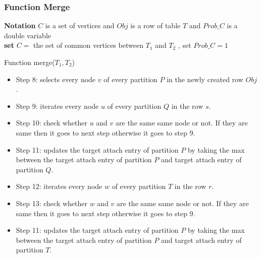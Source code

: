 \documentclass[12pt]{article}
\begin{document}
\subsubsection{Function Merge}
\begin{algorithm}[H]
\Indm  
{}

\textbf{Notation} $C$ is a set of vertices and $Obj$ is a row of table $T$ and $Prob\_C$ is a double variable\\
\Indp
\nl \textbf{set} $C=$ the set of common vertices between $T_1$ and $T_2$ , set $Prob\_C=1$\\
 \nl {}
\nl {}

 \caption{Function merge($T_1,T_2$)}
\end{algorithm}

\begin{itemize}
\item Step 8: selects every node $v$ of every partition $P$ in the newly created row $Obj$.
\item Step 9: iterates every node $u$ of every partition $Q$ in the row $s$.
\item Step 10: check whether $u$ and $v$ are the same same node or not. If they are same then it goes to next step otherwise it goes to step 9.
\item Step 11: updates the target attach entry of partition $P$ by taking the max between the target attach entry of partition $P$ and target attach entry of partition $Q$.
\item Step 12: iterates every node $w$ of every partition $T$ in the row $r$.
\item Step 13: check whether $w$ and $v$ are the same same node or not. If they are same then it goes to next step otherwise it goes to step 9.
\item Step 11: updates the target attach entry of partition $P$ by taking the max between the target attach entry of partition $P$ and target attach entry of partition $T$.
\end{itemize}
\end{document}
